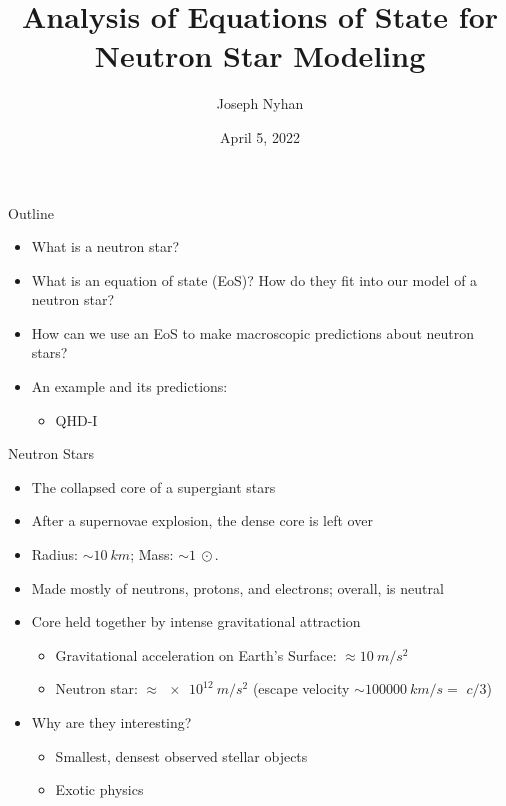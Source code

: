 \documentclass[]{beamer}
\title[Analysis of Equations of State]{Analysis of Equations of State for Neutron Star Modeling}
\author{Joseph Nyhan}
\date{April 5, 2022}
\institute{College of the Holy Cross}
\begin{document}
    \maketitle

    \begin{frame}{Outline}
        \pause
        \begin{itemize}
            \item What is a neutron star? \pause
            \item What is an equation of state (EoS)? \pause How do they fit into our model of a neutron star? \pause
            \item How can we use an EoS to make macroscopic predictions about neutron stars? \pause
            \item An example and its predictions: \pause
            \begin{itemize}
                \item QHD-I
            \end{itemize}
        \end{itemize}
    \end{frame}

    \begin{frame}{Neutron Stars}
        \pause
        \begin{itemize}
            \item The collapsed core of a supergiant stars \pause
            \item After a supernovae explosion, the dense core is left over \pause
            \item Radius: $\sim\SI{10}{km}$\pause ; Mass: $\sim\SI{1}{\odot}$. \pause
            \item Made mostly of neutrons, protons, and electrons\pause ; overall, is neutral \pause
            \item Core held together by intense gravitational attraction \pause
            \begin{itemize}
                \item Gravitational acceleration on Earth's Surface: $\approx \SI{10}{m/s^2}$ \pause
                \item Neutron star: $\approx \SI{e12}{m/s^2}$ \pause (escape velocity $\sim \SI{100000}{km/s} = $ \pause $c/3$)\pause
            \end{itemize}
            \item Why are they interesting? \pause \begin{itemize}
                \item Smallest, densest observed stellar objects \pause
                \item Exotic physics
            \end{itemize}
        \end{itemize}
    \end{frame}
\end{document}
